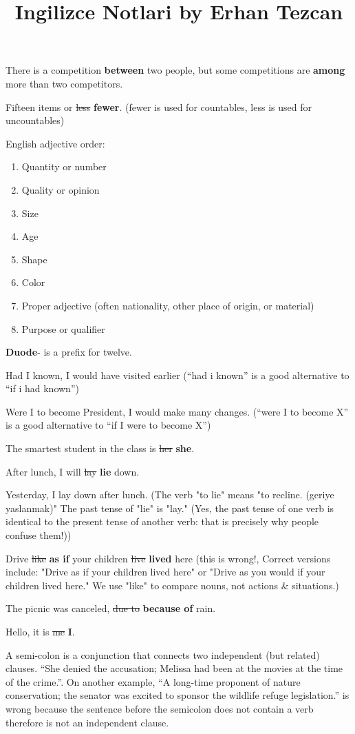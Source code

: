 \documentclass[12pt, a4paper]{ximera}
\title{Ingilizce Notlari by Erhan Tezcan}
\begin{document}
There is a competition \textbf{between} two people, but some competitions are \textbf{among} more than two competitors.

Fifteen items or \sout{less} \textbf{fewer}. (fewer is used for countables, less is used for uncountables)

English adjective order:
\begin{enumerate}
    \item Quantity or number
    \item Quality or opinion
    \item Size
    \item Age
    \item Shape
    \item Color
    \item Proper adjective (often nationality, other place of origin, or material)
    \item Purpose or qualifier
\end{enumerate}

\textbf{Duode}- is a prefix for twelve.

Had I known, I would have visited earlier (``had i known'' is a good alternative to ``if i had known'')

Were I to become President, I would make many changes. (``were I to become X'' is a good alternative to ``if I were to become X'')

The smartest student in the class is \sout{her} \textbf{she}.

After lunch, I will \sout{lay} \textbf{lie} down.

Yesterday, I lay down after lunch. (The verb "to lie" means "to recline. (geriye yaslanmak)" The past tense of "lie" is "lay." (Yes, the past tense of one verb is identical to the present tense of another verb: that is precisely why people confuse them!))

Drive \sout{like} \textbf{as if} your children \sout{live} \textbf{lived} here (this is wrong!, Correct versions include: "Drive as if your children lived here" or "Drive as you would if your children lived here." We use "like" to compare nouns, not actions \& situations.)

The picnic was canceled, \sout{due to} \textbf{because of} rain.

Hello, it is \sout{me} \textbf{I}.

A semi-colon is a conjunction that connects two independent (but related) clauses. ``She denied the accusation; Melissa had been at the movies at the time of the crime.''. On another example, ``A long-time proponent of nature conservation; the senator was excited to sponsor the wildlife refuge legislation.'' is wrong because the sentence before the semicolon does not contain a verb therefore is not an independent clause.
\end{document}
